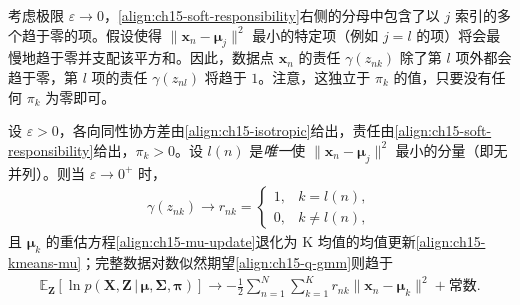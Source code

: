 \documentclass[../../main.tex]{subfiles}
\begin{document}
考虑极限 $\varepsilon\rightarrow0$，\eqref{align:ch15-soft-responsibility}右侧的分母中包含了以 $j$ 索引的多个趋于零的项。假设使得 $\|\bm{x}_n-\bm{\mu}_j\|^{2}$ 最小的特定项（例如 $j=l$ 的项）将会最慢地趋于零并支配该平方和。因此，数据点 $\bm{x}_n$ 的责任 $\gamma(z_{nk})$ 除了第 $l$ 项外都会趋于零，第 $l$ 项的责任 $\gamma(z_{nl})$ 将趋于 $1$。注意，这独立于 $\pi_k$ 的值，只要没有任何 $\pi_k$ 为零即可。

\begin{proposition}\label{proposition:ch15-EM的K均值极限}
设 $\varepsilon>0$，各向同性协方差由\eqref{align:ch15-isotropic}给出，责任由\eqref{align:ch15-soft-responsibility}给出，$\pi_k>0$。设 $l(n)$ 是\emph{唯一}使 $\|\bm{x}_n-\bm{\mu}_j\|^{2}$ 最小的分量（即无并列）。则当 $\varepsilon\rightarrow0^{+}$ 时，
\begin{align*}
\gamma(z_{nk})\longrightarrow r_{nk}=
\begin{cases}
1, & k=l(n),\\
0, & k\neq l(n),
\end{cases}
\end{align*}
且 $\bm{\mu}_k$ 的重估方程\eqref{align:ch15-mu-update}退化为 K 均值的均值更新\eqref{align:ch15-kmeans-mu}；完整数据对数似然期望\eqref{align:ch15-q-gmm}则趋于
\begin{align}
\mathbb{E}_{\bm{Z}}\!\left[\ln p(\bm{X},\bm{Z}\,|\,\bm{\mu},\bm{\Sigma},\bm{\pi})\right]\longrightarrow-\frac{1}{2}\sum_{n=1}^{N}\sum_{k=1}^{K}r_{nk}\|\bm{x}_n-\bm{\mu}_k\|^{2}+\text{常数}.
\label{align:ch15-kmeans-limit}
\end{align}
\end{proposition}
\end{document}
